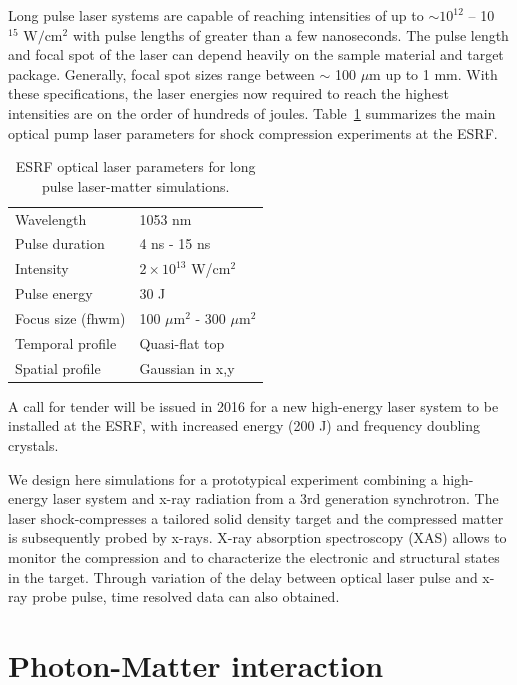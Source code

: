\documentclass[10pt]{scrartcl}
\begin{document}
Long pulse laser systems are capable of reaching intensities of up to $\sim
10^{12}$ -- 10$^{15} \text{ W}/\text{cm}^2$ with pulse lengths of greater than a
few nanoseconds. The pulse length and focal spot of the laser can depend heavily
on the sample material and target package. Generally, focal spot sizes range
between $\sim$ 100 $\mu$m up to 1 mm. With these specifications, the laser
energies now required to reach the highest intensities are on the order of
hundreds of joules.
Table~\ref{tab:esrf_long_pulse} summarizes the main optical pump laser
parameters for shock compression experiments at the ESRF.
\begin{table}[h]
  \centering
  \begin{tabular}{l|l}
    \hline
    \hline
Wavelength & 1053 nm \\
Pulse duration & 4 ns - 15 ns \\
Intensity & $2\times 10^{13}$ W/cm$^2$ \\
Pulse energy & 30 J \\
Focus size (fhwm) & 100 $\mu\text{m}^{2}$ - 300 $\mu\text{m}^{2}$  \\
Temporal profile  & Quasi-flat top \\
Spatial profile & Gaussian in x,y \\
    \hline
    \hline
  \end{tabular}
  \caption{ESRF optical laser parameters for long pulse laser-matter
  simulations.}
  \label{tab:esrf_long_pulse}
\end{table}
A call for tender will be issued in 2016 for a new high-energy laser system to be installed at the ESRF, with increased energy (200 J) and
frequency doubling crystals.

We design here simulations for a prototypical experiment combining a high-energy
laser system and x-ray radiation from a 3rd generation synchrotron. The laser
shock-compresses a tailored solid density target and the compressed matter is
subsequently probed by x-rays. X-ray absorption spectroscopy (XAS) allows to
monitor the compression and to characterize the electronic and structural states
in the target. Through variation of the delay between optical laser pulse and
x-ray probe pulse, time resolved data can also obtained.

%
\section{Photon-Matter interaction}
%
\end{document}

